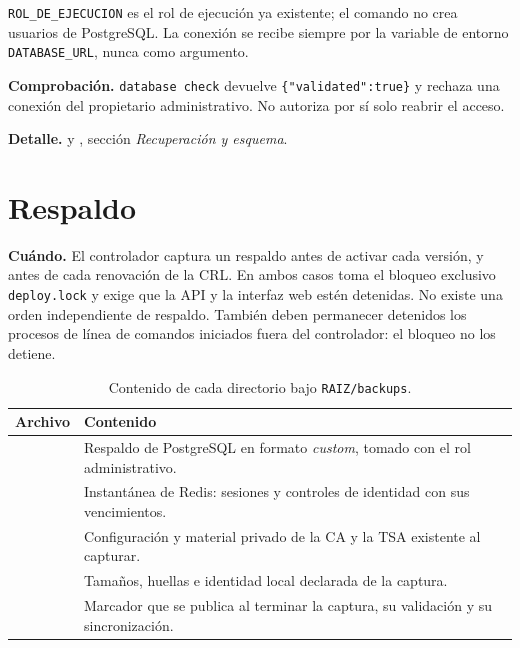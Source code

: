 \texttt{ROL\_DE\_EJECUCION} es el rol de ejecución ya existente; el comando no
crea usuarios de PostgreSQL. La conexión se recibe siempre por la variable de
entorno \texttt{DATABASE\_URL}, nunca como argumento.

\textbf{Comprobación.} \texttt{database check} devuelve
\texttt{\{"validated":true\}} y rechaza una conexión del propietario
administrativo. No autoriza por sí solo reabrir el acceso.


\textbf{Detalle.}  y
, sección \emph{Recuperación y esquema}.

\section{Respaldo}\label{sec:op-respaldo}

\textbf{Cuándo.} El controlador  captura un
respaldo antes de activar cada versión, y 
antes de cada renovación de la CRL. En ambos casos toma el bloqueo exclusivo
\texttt{deploy.lock} y exige que la API y la interfaz web estén detenidas. No
existe una orden independiente de respaldo. También deben permanecer
detenidos los procesos de línea de comandos iniciados fuera del controlador:
el bloqueo no los detiene.

\begin{table}[H]
  \centering
  \caption{Contenido de cada directorio bajo
    \texttt{RAIZ/backups}.}\label{tab:op-respaldo}
  \begin{tabularx}{\textwidth}{L{4.6cm} Y}
    \toprule
    \textbf{Archivo} & \textbf{Contenido} \\
    \midrule
      & Respaldo de PostgreSQL en formato \emph{custom}, tomado con el rol
        administrativo. \\
      & Instantánea de Redis: sesiones y controles de identidad con sus
        vencimientos. \\
      & Configuración y material privado de la CA y la TSA existente al
        capturar. \\
      & Tamaños, huellas e identidad local declarada de la captura. \\
      & Marcador que se publica al terminar la captura, su validación y su
        sincronización. \\
    \bottomrule
  \end{tabularx}
\end{table}

